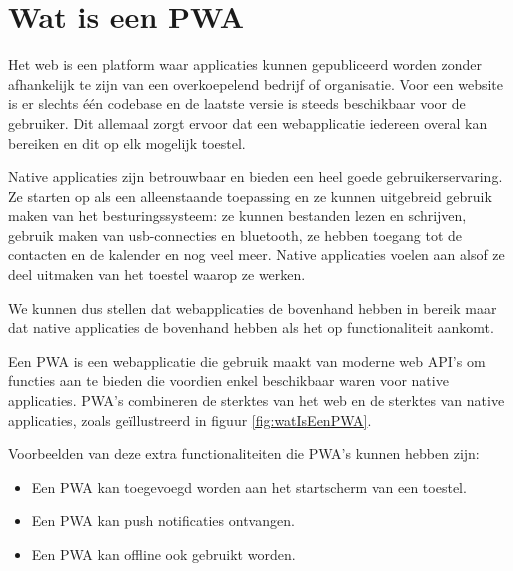 
\section{Wat is een PWA}
\label{ch: Wat is een PWA}

Het web is een platform waar applicaties kunnen gepubliceerd worden zonder afhankelijk te zijn van een overkoepelend bedrijf of organisatie. Voor een website is er slechts één codebase en de laatste versie is steeds beschikbaar voor de gebruiker. 
Dit allemaal zorgt ervoor dat een webapplicatie iedereen overal kan bereiken en dit op elk mogelijk toestel.

Native applicaties zijn betrouwbaar en bieden een heel goede gebruikerservaring. Ze starten op als een alleenstaande toepassing en ze kunnen uitgebreid gebruik maken van het besturingssysteem: ze kunnen bestanden lezen en schrijven, gebruik maken van usb-connecties en bluetooth, ze hebben toegang tot de contacten en de kalender en nog veel meer. Native applicaties voelen aan alsof ze deel uitmaken van het toestel waarop ze werken.

We kunnen dus stellen dat webapplicaties de bovenhand hebben in bereik maar dat native applicaties de bovenhand hebben als het op functionaliteit aankomt.

Een PWA is een webapplicatie die gebruik maakt van moderne web API's om functies aan te bieden die voordien enkel beschikbaar waren voor native applicaties. PWA's combineren de sterktes van het web en de sterktes van native applicaties, zoals geïllustreerd in figuur \ref{fig:watIsEenPWA}.
\autocite{Richard2020}
\autocite{Google2020}

Voorbeelden van deze extra functionaliteiten die PWA's kunnen hebben zijn: 

\begin{itemize}
	\item Een PWA kan toegevoegd worden aan het startscherm van een toestel.
	\item Een PWA kan push notificaties ontvangen.
	\item Een PWA kan offline ook gebruikt worden.
\end{itemize}

